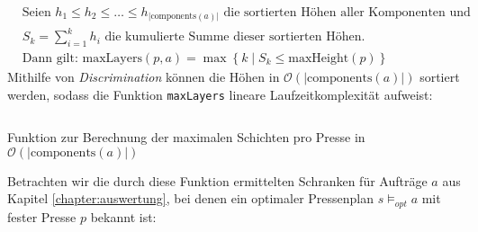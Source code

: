 \begin{align*}
    &\hspace{0pt}\text{Seien } h_1 \leq h_2 \leq \ldots \leq h_{\lvert \text{components}(a)\rvert} \text{ die sortierten Höhen aller Komponenten und} \\
    &\hspace{0pt}S_k = \sum_{i = 1}^{k} h_i \text{ die kumulierte Summe dieser sortierten Höhen.} \\
    &\hspace{0pt}\text{Dann gilt: } \text{maxLayers}(p,a) = \max\left\{ k \mid S_k \leq \text{maxHeight}(p) \right\}
\end{align*}
Mithilfe von \textit{Discrimination} \cite{discriminationPaper, discriminationHaskell} können die Höhen in $\mathcal{O}(\lvert \text{components}(a) \rvert)$ sortiert werden,
sodass die Funktion \texttt{maxLayers} lineare Laufzeitkomplexität aufweist:

\begin{listing}[H]
    \inputminted[linenos=true]{haskell}{Code/Implementierung/MaxLayers.hs}
    \caption{Funktion zur Berechnung der maximalen Schichten pro Presse in $\mathcal{O}(\lvert \text{components}(a) \rvert)$}
    \label{listing:maxlayersimpl}
\end{listing}
Betrachten wir die durch diese Funktion ermittelten Schranken für Aufträge $a$ aus Kapitel \ref{chapter:auswertung},
bei denen ein optimaler Pressenplan $s \models_{opt} a$ mit fester Presse $p$ bekannt ist:

